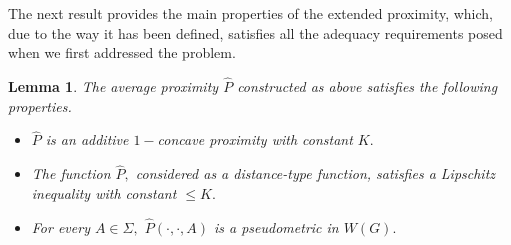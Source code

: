 \documentclass[preprint,12pt]{elsarticle}
\newtheorem{lemma}[theorem]{Lemma}
\begin{document}
The next result provides the main properties of the extended proximity, which, due to the way it has been defined, satisfies all the adequacy requirements posed when we first addressed the problem.

\begin{lemma}
The average proximity $\widehat P$ constructed as above satisfies the following properties.
\begin{itemize}

    \item[(i)] $\widehat P$ is an additive $1-$concave proximity with constant $K.$
    
    \item[(ii)] The function $\widehat P,$ considered as a distance-type function, satisfies a Lipschitz inequality with constant $\le K.$

    \item[(iii)] For every $A \in \Sigma,$ $\widehat P(\cdot,\cdot,A)$ is a pseudometric in $W(G).$
    
\end{itemize}
\end{lemma}
\end{document}
